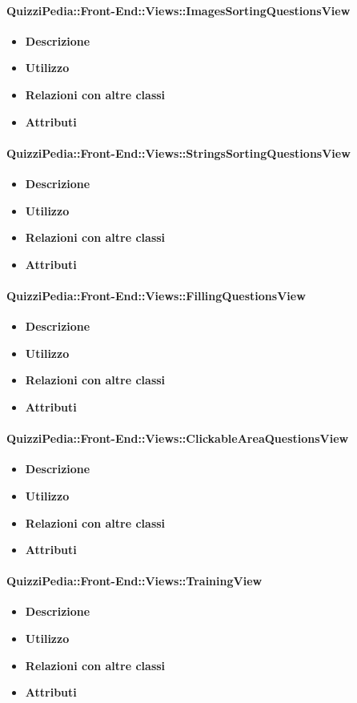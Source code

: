 \paragraph{QuizziPedia::Front-End::Views::ImagesSortingQuestionsView}
\begin{itemize}
	\item \textbf{Descrizione}
	\item \textbf{Utilizzo}
	\item \textbf{Relazioni con altre classi}
	\item \textbf{Attributi}
	\end{itemize}
\paragraph{QuizziPedia::Front-End::Views::StringsSortingQuestionsView}
\begin{itemize}
	\item \textbf{Descrizione}
	\item \textbf{Utilizzo}
	\item \textbf{Relazioni con altre classi}
	\item \textbf{Attributi}
	\end{itemize}
\paragraph{QuizziPedia::Front-End::Views::FillingQuestionsView}
\begin{itemize}
	\item \textbf{Descrizione}
	\item \textbf{Utilizzo}
	\item \textbf{Relazioni con altre classi}
	\item \textbf{Attributi}
	\end{itemize}
\paragraph{QuizziPedia::Front-End::Views::ClickableAreaQuestionsView}
\begin{itemize}
	\item \textbf{Descrizione}
	\item \textbf{Utilizzo}
	\item \textbf{Relazioni con altre classi}
	\item \textbf{Attributi}
	\end{itemize}
\paragraph{QuizziPedia::Front-End::Views::TrainingView}
\begin{itemize}
	\item \textbf{Descrizione}
	\item \textbf{Utilizzo}
	\item \textbf{Relazioni con altre classi}
	\item \textbf{Attributi}
	\end{itemize}
